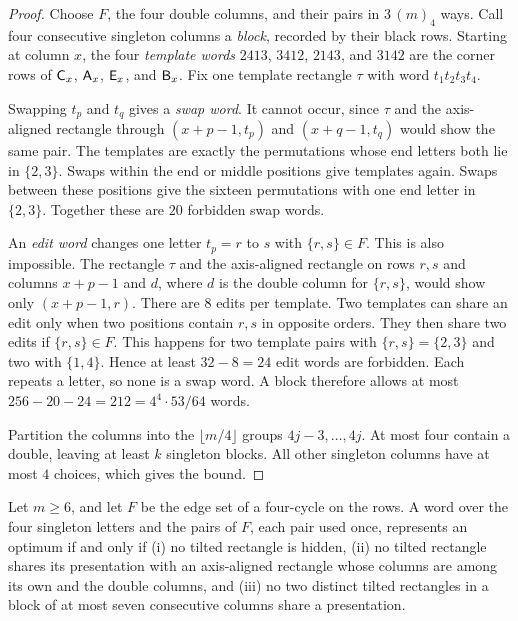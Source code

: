 \begin{proof}
Choose $F$, the four double columns, and their pairs in $3\,(m)_4$ ways. Call four consecutive singleton columns a
\emph{block}, recorded by their black rows. Starting at column $x$,
the four \emph{template words} $2413$, $3412$, $2143$, and $3142$
are the corner rows of $\mathsf{C}_x$, $\mathsf{A}_x$, $\mathsf{E}_x$, and $\mathsf{B}_x$.
Fix one template rectangle $\tau$ with word $t_1t_2t_3t_4$.

Swapping $t_p$ and $t_q$ gives a \emph{swap word}. It cannot occur,
since $\tau$ and the axis-aligned rectangle through $(x+p-1,t_p)$ and
$(x+q-1,t_q)$ would show the same pair. The templates are exactly the
permutations whose end letters both lie in $\{2,3\}$. Swaps within
the end or middle positions give templates again. Swaps between these
positions give the sixteen permutations with one end letter in
$\{2,3\}$. Together these are $20$ forbidden swap words.

An \emph{edit word} changes one letter $t_p=r$ to $s$ with
$\{r,s\}\in F$. This is also impossible. The rectangle $\tau$ and the
axis-aligned rectangle on rows $r,s$ and columns $x+p-1$ and $d$,
where $d$ is the double column for $\{r,s\}$, would show only
$(x+p-1,r)$. There are $8$ edits per template. Two templates can
share an edit only when two positions contain $r,s$ in opposite orders.
They then share two edits if $\{r,s\}\in F$. This happens for two
template pairs with $\{r,s\}=\{2,3\}$ and two with $\{1,4\}$.
Hence at least $32-8=24$ edit words are forbidden. Each repeats a letter, so none is a swap word. A block therefore
allows at most $256-20-24=212=4^4\cdot53/64$ words.

Partition the columns into the $\lfloor m/4\rfloor$ groups
$4j-3,\ldots,4j$. At most four contain a double, leaving at least
$k$ singleton blocks. All other singleton columns have at most $4$
choices, which gives the bound.
\end{proof}

\begin{lemma}\label{lem:fourmemory}
Let $m\ge6$, and let $F$ be the edge set of a four-cycle on the rows. A word over the
four singleton letters and the pairs of $F$, each pair used once, represents an optimum
if and only if (i) no tilted rectangle is hidden, (ii) no tilted rectangle shares its
presentation with an axis-aligned rectangle whose columns are among its own and the
double columns, and (iii) no two distinct tilted rectangles in a block of at most seven
consecutive columns share a presentation.
\end{lemma}

